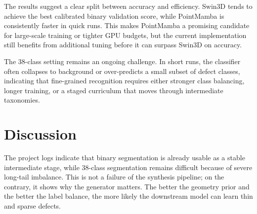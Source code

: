 \documentclass[conference]{IEEEtran}
\begin{document}
\begin{table}[t]
\centering
\caption{Pilot results on the synthetic validation set and quick-run backbone comparison.}
\label{tab:results}
\small
\setlength{\tabcolsep}{4pt}
\end{table}

The results suggest a clear split between accuracy and efficiency. Swin3D tends to achieve the best calibrated binary validation score, while PointMamba is consistently faster in quick runs. This makes PointMamba a promising candidate for large-scale training or tighter GPU budgets, but the current implementation still benefits from additional tuning before it can surpass Swin3D on accuracy.

The 38-class setting remains an ongoing challenge. In short runs, the classifier often collapses to background or over-predicts a small subset of defect classes, indicating that fine-grained recognition requires either stronger class balancing, longer training, or a staged curriculum that moves through intermediate taxonomies.

\section{Discussion}
The project logs indicate that binary segmentation is already usable as a stable intermediate stage, while 38-class segmentation remains difficult because of severe long-tail imbalance. This is not a failure of the synthesis pipeline; on the contrary, it shows why the generator matters. The better the geometry prior and the better the label balance, the more likely the downstream model can learn thin and sparse defects.
\end{document}
